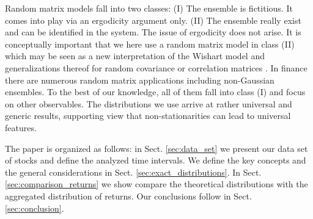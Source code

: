 Random matrix models \cite{random_matrix_1,random_matrix_2} fall into two
classes: (I) The ensemble is fictitious. It comes into play via an ergodicity
argument only. (II) The ensemble really exist and can be identified in the
system. The issue of ergodicity does not arise. It is conceptually important
that we here use a random matrix model in class (II) which may be seen as a new
interpretation of the Wishart model and generalizations thereof for random
covariance or correlation matrices \cite{wishart}. In finance there are
numerous random matrix applications
\cite{matrix_fin_01,matrix_fin_02,matrix_fin_03,matrix_fin_04,matrix_fin_05,matrix_fin_06,matrix_fin_07,matrix_fin_08,matrix_fin_09,matrix_fin_10,matrix_fin_11,matrix_fin_12,matrix_fin_13}
including non-Gaussian ensembles. To the best of our knowledge, all of them
fall into class (I) and focus on other observables. The distributions we use
arrive at rather universal and generic results, supporting view that
non-stationarities can lead to universal features.

The paper is organized as follows: in Sect. \ref{sec:data_set} we present our
data set of stocks and define the analyzed time intervals. We define the key
concepts and the general considerations in Sect. \ref{sec:exact_distributions}.
In Sect. \ref{sec:comparison_returns} we show compare the theoretical
distributions with the aggregated distribution of returns. Our conclusions
follow in Sect. \ref{sec:conclusion}.